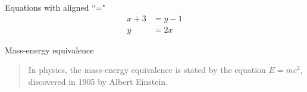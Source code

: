 \documentclass[11pt]{article}     %
\begin{document}
\vspace{1cm}

Equations with aligned ``=" \\    %
\begin{align}
    x + 3 &= y - 1 \\             %
    y &= 2x
\end{align}
\vspace{1cm}

Mass-energy equivalence \\
\begin{quote}
    In physics, the mass-energy equivalence is stated by the equation $E=mc^2$, discovered in 1905 by Albert Einstein. %
\end{quote}
\end{document}

